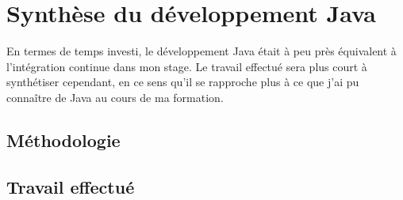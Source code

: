 \section{Synthèse du développement Java}
\label{sec:synthese_java}
En termes de temps investi, le développement Java était à peu près équivalent à l'intégration continue dans mon stage. Le travail effectué sera plus court à synthétiser cependant, en ce sens qu'il se rapproche plus à ce que j'ai pu connaître de Java au cours de ma formation. 

\subsection{Méthodologie}
\subsection{Travail effectué}